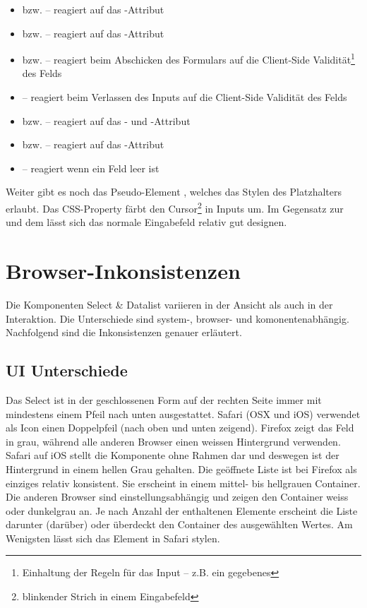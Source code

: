 \begin{itemize}
    \item {} bzw.  – reagiert auf das -Attribut
    \item {} bzw.  – reagiert auf das -Attribut
    \item {} bzw.  – reagiert beim Abschicken des Formulars auf die Client-Side Validität\footnote{
            Einhaltung der Regeln für das Input – z.B. ein gegebenes 
        } des Felds
    \item {} – reagiert beim Verlassen des Inputs auf die Client-Side Validität des Felds
    \item {} bzw.  – reagiert auf das - und -Attribut
    \item {} bzw.  – reagiert auf das -Attribut
    \item {} – reagiert wenn ein Feld leer ist
\end{itemize}

Weiter gibt es noch das Pseudo-Element , welches das Stylen des Platzhalters erlaubt. 
Das CSS-Property  färbt den Cursor\footnote{
    blinkender Strich in einem Eingabefeld
} in Inputs um. 
Im Gegensatz zur  und dem  lässt sich das normale Eingabefeld relativ gut designen. 


\clearpage
\section{Browser-Inkonsistenzen}
\label{sec:browserInconsistency}

Die Komponenten Select \& Datalist variieren in der Ansicht als auch in der Interaktion. 
Die Unterschiede sind system-, browser- und komonentenabhängig. 
Nachfolgend sind die Inkonsistenzen genauer erläutert. 


\subsection{UI Unterschiede}
\label{sec:uiDifferences}

Das Select ist in der geschlossenen Form auf der rechten Seite immer mit mindestens einem Pfeil nach unten ausgestattet. 
Safari (OSX und iOS) verwendet als Icon einen Doppelpfeil (nach oben und unten zeigend). 
Firefox zeigt das Feld in grau, während alle anderen Browser einen weissen Hintergrund verwenden. 
Safari auf iOS stellt die Komponente ohne Rahmen dar und deswegen ist der Hintergrund in einem hellen Grau gehalten. 
Die geöffnete Liste ist bei Firefox als einziges relativ konsistent. 
Sie erscheint in einem mittel- bis hellgrauen Container. 
Die anderen Browser sind einstellungsabhängig und zeigen den Container weiss oder dunkelgrau an. 
Je nach Anzahl der enthaltenen Elemente erscheint die Liste darunter (darüber) oder überdeckt den Container des ausgewählten Wertes. 
Am Wenigsten lässt sich das Element in Safari stylen. 

